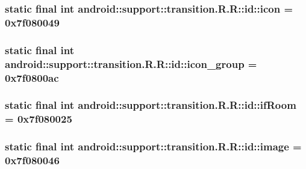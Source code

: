 \hypertarget{classandroid_1_1support_1_1transition_1_1_r_1_1id_593e49f12fd790ba09004f6aed7496bc}{
\subsubsection[{icon}]{\setlength{\rightskip}{0pt plus 5cm}static final int android::support::transition.R.R::id::icon = 0x7f080049}}
\label{classandroid_1_1support_1_1transition_1_1_r_1_1id_593e49f12fd790ba09004f6aed7496bc}


\hypertarget{classandroid_1_1support_1_1transition_1_1_r_1_1id_2818e9d37211481fc83bb877c1b0faab}{
\subsubsection[{icon\_\-group}]{\setlength{\rightskip}{0pt plus 5cm}static final int android::support::transition.R.R::id::icon\_\-group = 0x7f0800ac}}
\label{classandroid_1_1support_1_1transition_1_1_r_1_1id_2818e9d37211481fc83bb877c1b0faab}


\hypertarget{classandroid_1_1support_1_1transition_1_1_r_1_1id_044c00074bc502a7235c3238566fc3f4}{
\subsubsection[{ifRoom}]{\setlength{\rightskip}{0pt plus 5cm}static final int android::support::transition.R.R::id::ifRoom = 0x7f080025}}
\label{classandroid_1_1support_1_1transition_1_1_r_1_1id_044c00074bc502a7235c3238566fc3f4}


\hypertarget{classandroid_1_1support_1_1transition_1_1_r_1_1id_9bd0f0c59fb307b4ec49c9c3cf51612d}{
\subsubsection[{image}]{\setlength{\rightskip}{0pt plus 5cm}static final int android::support::transition.R.R::id::image = 0x7f080046}}
\label{classandroid_1_1support_1_1transition_1_1_r_1_1id_9bd0f0c59fb307b4ec49c9c3cf51612d}


